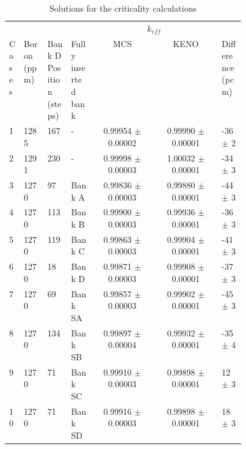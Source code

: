 \documentclass[11pt,a4paper,onecolumn,oneside]{report}
\begin{document}
\begin{table}[!b]
  \centering
  \caption{Solutions for the criticality calculations}
  \label{tab1} 
\begin{adjustbox}{width=1.0\textwidth} %
  \begin{tabular}{| p{0.05\linewidth} | p{0.1\linewidth} | p{0.1\linewidth} | p{0.1\linewidth} | c | c | p{0.1\linewidth} |}
  \hline 
         &             &                 &                     & \multicolumn{2}{c|}{$k_{eff}$}             &            \\
   \cline{5-6}
   Cases & Boron (ppm) & Bank D Position (steps) & Fully inserted bank & MCS                   & KENO                  & Difference (pcm) \\
   \hline
   1     & 1285        & 167             & -                   & 0.99954 $\pm$ 0.00002 & 0.99990 $\pm$ 0.00001 & -36 $\pm$ 2   \\ \hline
   2     & 1291        & 230             & -                   & 0.99998 $\pm$ 0.00003 & 1.00032 $\pm$ 0.00001 & -34 $\pm$ 3   \\ \hline
   3     & 1270        & 97              & Bank A              & 0.99836 $\pm$ 0.00003 & 0.99880 $\pm$ 0.00001 & -44 $\pm$ 3   \\ \hline
   4     & 1270        & 113             & Bank B              & 0.99900 $\pm$ 0.00003 & 0.99936 $\pm$ 0.00001 & -36 $\pm$ 3   \\ \hline
   5     & 1270        & 119             & Bank C              & 0.99863 $\pm$ 0.00003 & 0.99904 $\pm$ 0.00001 & -41 $\pm$ 3   \\ \hline
   6     & 1270        & 18              & Bank D              & 0.99871 $\pm$ 0.00003 & 0.99908 $\pm$ 0.00001 & -37 $\pm$ 3   \\ \hline
   7     & 1270        & 69              & Bank SA             & 0.99857 $\pm$ 0.00003 & 0.99902 $\pm$ 0.00001 & -45 $\pm$ 3   \\ \hline
   8     & 1270        & 134             & Bank SB             & 0.99897 $\pm$ 0.00004 & 0.99932 $\pm$ 0.00001 & -35 $\pm$ 4   \\ \hline
   9     & 1270        & 71              & Bank SC             & 0.99910 $\pm$ 0.00003 & 0.99898 $\pm$ 0.00001 & 12  $\pm$ 3   \\ \hline
   10    & 1270        & 71              & Bank SD             & 0.99916 $\pm$ 0.00003 & 0.99898 $\pm$ 0.00001 & 18  $\pm$ 3   \\ \hline
  \end{tabular}
  \end{adjustbox}
\end{table}
\end{document}
